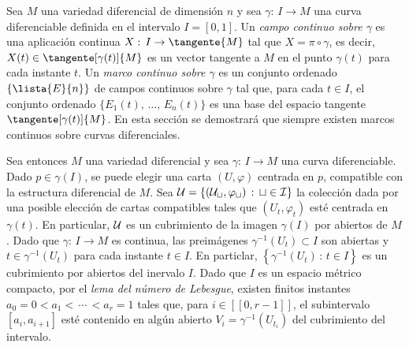 
Sea $M$ una variedad diferencial de dimensi\'{o}n $n$ y sea
$\gamma:\,I\rightarrow M$ una curva diferenciable definida en el intervalo
$I=[0,1]$. Un \emph{campo continuo sobre $\gamma$} es una aplicaci\'{o}n
continua $X:\,I\rightarrow\tangente{M}$ tal que $X=\pi\circ\gamma$, es decir,
$X(t)\in\tangente[\gamma(t)]{M}$ es un vector tangente a $M$ en el punto
$\gamma(t)$ para cada instante $t$. Un \emph{marco continuo sobre $\gamma$}
es un conjunto ordenado $\{\lista{E}{n}\}$ de campos continuos sobre $\gamma$
tal que, para cada $t\in I$, el conjunto ordenado
$\{E_{1}(t),\,\dots,\,E_{n}(t)\}$ es una base del espacio tangente
$\tangente[\gamma(t)]{M}$. En esta secci\'{o}n se demostrar\'{a} que siempre
existen marcos continuos sobre curvas diferenciales.

Sea entonces $M$ una variedad diferencial y sea $\gamma:\,I\rightarrow M$
una curva diferenciable. Dado $p\in\gamma(I)$, se puede elegir una carta
$(U,\varphi)$ centrada en $p$, compatible con la estructura diferencial
de $M$. Sea $\cal{U}=\left\lbrace (U_{t},\varphi_{t})\,:\,%
t\in I\right\rbrace$ la colecci\'{o}n dada por una posible elecci\'{o}n
de cartas compatibles tales que $(U_{t},\varphi_{t})$ est\'{e} centrada en
$\gamma(t)$. En particular, $\cal{U}$ es un cubrimiento de la imagen
$\gamma(I)$ por abiertos de $M$. Dado que $\gamma:\,I\rightarrow M$ es
continua, las preim\'{a}genes $\gamma^{-1}(U_{t})\subset I$ son abiertas
y $t\in\gamma^{-1}(U_{t})$ para cada instante $t\in I$. En particlar,
$\left\lbrace\gamma^{-1}(U_{t})\,:\,t\in I\right\rbrace$ es un cubrimiento
por abiertos del inervalo $I$. Dado que $I$ es un espacio m\'{e}trico
compacto, por el \emph{lema del n\'{u}mero de Lebesgue}, existen finitos
instantes $a_{0}=0<a_{1}<\,\cdots\,<a_{r}=1$ tales que, para
$i\in[\![0,r-1]\!]$, el subintervalo $[a_{i},a_{i+1}]$ est\'{e} contenido
en alg\'{u}n abierto $V_{i}=\gamma^{-1}(U_{t_{i}})$ del cubrimiento
del intervalo.

